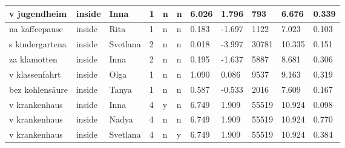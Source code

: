 \begin{longtable}{|p{4cm}|p{1cm}|p{1.2cm}|p{0.5cm}|p{0.5cm}|p{0.5cm}|R{1cm}|R{1cm}|R{1cm}|R{1cm}|R{1cm}|}
v jugendheim               & inside            & Inna          & 1                                   & n                          & n                          & 6.026      & 1.796         & 793                     & 6.676                         & 0.339                   \\ \hline
na kaffeepause             & inside            & Rita          & 1                                   & n                          & n                          & 0.183      & -1.697        & 1122                    & 7.023                         & 0.103                   \\ \hline
s kindergartena            & inside            & Svetlana      & 2                                   & n                          & n                          & 0.018      & -3.997        & 30781                   & 10.335                        & 0.151                   \\ \hline
za klamotten               & inside            & Inna          & 2                                   & n                          & n                          & 0.195      & -1.637        & 5887                    & 8.681                         & 0.306                   \\ \hline
v klassenfahrt             & inside            & Olga          & 1                                   & n                          & n                          & 1.090      & 0.086         & 9537                    & 9.163                         & 0.319                   \\ \hline
bez kohlens\"{a}ure        & inside            & Tanya         & 1                                   & n                          & n                          & 0.587      & -0.533        & 2016                    & 7.609                         & 0.167                   \\ \hline
v krankenhaus              & inside            & Inna          & 4                                   & y                          & n                          & 6.749      & 1.909         & 55519                   & 10.924                        & 0.098                   \\ \hline
v krankenhaus              & inside            & Nadya         & 4                                   & n                          & n                          & 6.749      & 1.909         & 55519                   & 10.924                        & 0.770                   \\ \hline
v krankenhaus              & inside            & Svetlana      & 4                                   & n                          & y                          & 6.749      & 1.909         & 55519                   & 10.924                        & 0.384                   \\ \hline

\end{longtable}
